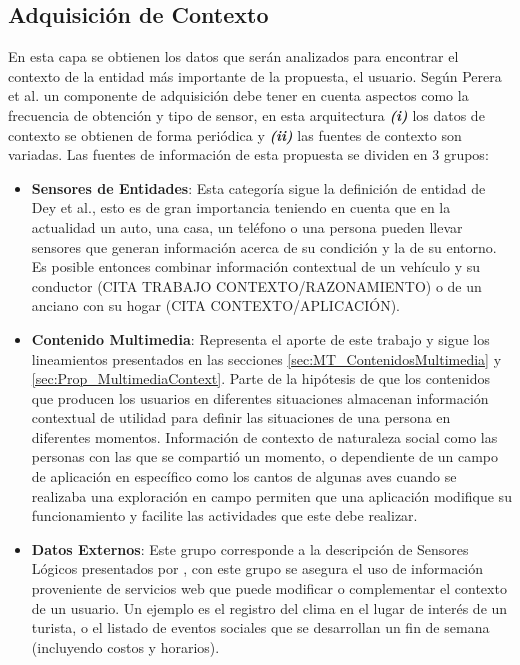 \subsection{Adquisición de Contexto}
\label{subsec:Prop_Adquisicion}

En esta capa se obtienen los datos que serán analizados para encontrar el contexto de la entidad más importante de la propuesta, el usuario. Según Perera et al.\cite{Perera2014} un componente de adquisición debe tener en cuenta aspectos como la frecuencia de obtención y tipo de sensor, en esta arquitectura \textbf{\textit{(i)}} los datos de contexto se obtienen de forma periódica y \textbf{\textit{(ii)}} las fuentes de contexto son variadas. Las fuentes de información de esta propuesta se dividen en 3 grupos:
\begin{itemize}
    \item \textbf{Sensores de Entidades}: Esta categoría sigue la definición de entidad de Dey et al.\cite{Dey2001}, esto es de gran importancia teniendo en cuenta que en la actualidad un auto, una casa, un teléfono o una persona pueden llevar sensores que generan información acerca de su condición y la de su entorno. Es posible entonces combinar información contextual de un vehículo y su conductor (CITA TRABAJO CONTEXTO/RAZONAMIENTO) o de un anciano con su hogar (CITA CONTEXTO/APLICACIÓN).
    \item \textbf{Contenido Multimedia}: Representa el aporte de este trabajo y sigue los lineamientos presentados en las secciones \ref{sec:MT_ContenidosMultimedia} y \ref{sec:Prop_MultimediaContext}. Parte de la hipótesis de que los contenidos que producen los usuarios en diferentes situaciones almacenan información contextual de utilidad para definir las situaciones de una persona en diferentes momentos. Información de contexto de naturaleza social como las personas con las que se compartió un momento, o dependiente de un campo de aplicación en específico como los cantos de algunas aves cuando se realizaba una exploración en campo permiten que una aplicación modifique su funcionamiento y facilite las actividades que este debe realizar.
    \item \textbf{Datos Externos}: Este grupo corresponde a la descripción de Sensores Lógicos presentados por \cite{Perera2014}, con este grupo se asegura el uso de información proveniente de servicios web que puede modificar o complementar el contexto de un usuario. Un ejemplo es el registro del clima en el lugar de interés de un turista, o el listado de eventos sociales que se desarrollan un fin de semana (incluyendo costos y horarios).
\end{itemize}

